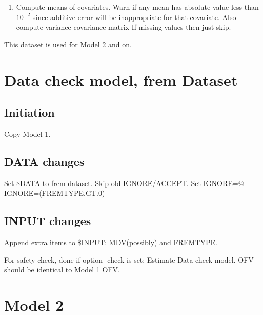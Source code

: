 \begin{enumerate}
	\item Compute means of %
    covariates. Warn if any mean %
    has absolute value less than $10^{-2}$ since additive error will be inappropriate for that covariate.
    Also compute variance-covariance matrix %
    If missing values then just skip.
\end{enumerate}

This dataset is used for Model 2 and on.

\section{Data check model, frem Dataset}
\subsection{Initiation}
Copy Model 1.

\subsection{DATA changes}
Set \$DATA to frem dataset. Skip old IGNORE/ACCEPT. Set IGNORE=@ IGNORE=(FREMTYPE.GT.0)

\subsection{INPUT changes}
Append extra items to \$INPUT: MDV(possibly) and FREMTYPE.

For safety check, done if option -check is set: Estimate Data check model. OFV should be identical to Model 1 OFV.


\section{Model 2}




